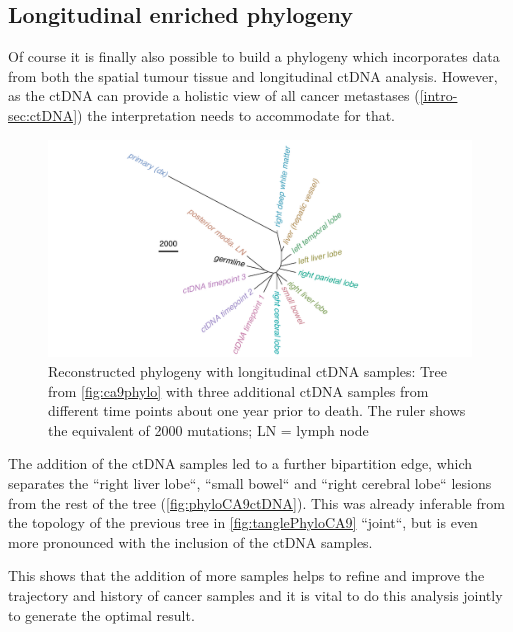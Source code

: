 \subsection{Longitudinal enriched phylogeny}
\label{variantcalling-sec:fullphylo}
Of course it is finally also possible to build a phylogeny which incorporates data from both the spatial tumour tissue and longitudinal ctDNA analysis. However, as the ctDNA can provide a holistic view of all cancer metastases (\autoref{intro-sec:ctDNA}) the interpretation needs to accommodate for that. 

\begin{figure}[ht]
\centering
\includegraphics[width=.99\linewidth]{Figures/jointVariantCalling/phyloCA9_withctDNA.pdf}
\caption[Reconstructed phylogeny with longitudinal ctDNA samples]{Reconstructed phylogeny with longitudinal ctDNA samples: Tree from \autoref{fig:ca9phylo} with three additional ctDNA samples from different time points about one year prior to death. The ruler shows the equivalent of 2000 mutations; LN = lymph node} \label{fig:phyloCA9ctDNA}
\end{figure}

The addition of the ctDNA samples led to a further bipartition edge, which separates the ``right liver lobe``, ``small bowel`` and ``right cerebral lobe`` lesions from the rest of the tree (\autoref{fig:phyloCA9ctDNA}). This was already inferable from the topology of the previous tree in \autoref{fig:tanglePhyloCA9} ``joint``, but is even more pronounced with the inclusion of the ctDNA samples.

This shows that the addition of more samples helps to refine and improve the trajectory and history of cancer samples and it is vital to do this analysis jointly to generate the optimal result.